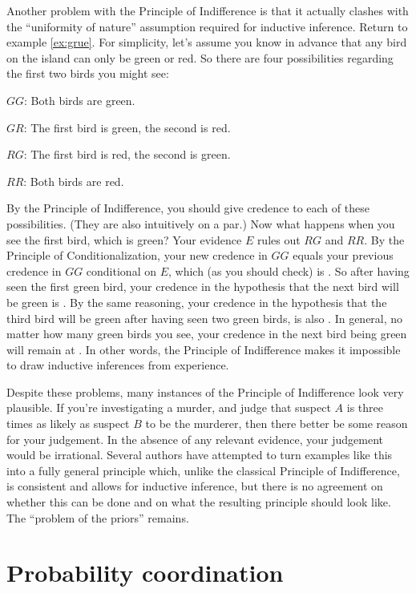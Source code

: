 Another problem with the Principle of Indifference is that it actually
clashes with the ``uniformity of nature'' assumption required for
inductive inference. Return to example \ref{ex:grue}. For simplicity,
let's assume you know in advance that any bird on the island can only
be green or red. So there are four possibilities regarding the first
two birds you might see:
\begin{enumerate*}
\item[$GG$:] Both birds are green.
\item[$GR$:] The first bird is green, the second is red.
\item[$RG$:] The first bird is red, the second is green.
\item[$RR$:] Both birds are red. 
\end{enumerate*}
By the Principle of Indifference, you should give credence
 to each of these possibilities. (They are also
intuitively on a par.) Now what happens when you see the first bird,
which is green? Your evidence $E$ rules out $RG$ and $RR$. By the
Principle of Conditionalization, your new credence in $GG$ equals your
previous credence in $GG$ conditional on $E$, which (as you should
check) is . So after having seen the first green bird,
your credence in the hypothesis that the next bird will be green is
.  By the same reasoning, your credence in the
hypothesis that the third bird will be green after having seen two
green birds, is also . In general, no matter how many
green birds you see, your credence in the next bird being green will
remain at . In other words, the Principle of
Indifference makes it impossible to draw inductive inferences from
experience.

Despite these problems, many instances of the Principle of
Indifference look very plausible. If you're investigating a murder,
and judge that suspect $A$ is three times as likely as suspect $B$ to
be the murderer, then there better be some reason for your
judgement. In the absence of any relevant evidence, your judgement
would be irrational. Several authors have attempted to turn examples
like this into a fully general principle which, unlike the classical
Principle of Indifference, is consistent and allows for inductive
inference, but there is no agreement on whether this can be done and
on what the resulting principle should look like.  The ``problem of
the priors'' remains.

\section{Probability coordination}

